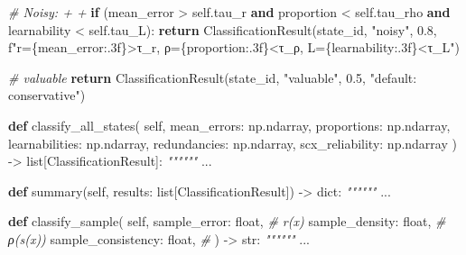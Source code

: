 \documentclass[
  12pt,
]{article}
\newenvironment{Shaded}{}{}
\newcommand{\BuiltInTok}[1]{\textcolor[rgb]{0.00,0.50,0.00}{#1}}
\newcommand{\CommentTok}[1]{\textcolor[rgb]{0.38,0.63,0.69}{\textit{#1}}}
\newcommand{\ControlFlowTok}[1]{\textcolor[rgb]{0.00,0.44,0.13}{\textbf{#1}}}
\newcommand{\FloatTok}[1]{\textcolor[rgb]{0.25,0.63,0.44}{#1}}
\newcommand{\KeywordTok}[1]{\textcolor[rgb]{0.00,0.44,0.13}{\textbf{#1}}}
\newcommand{\NormalTok}[1]{#1}
\newcommand{\OperatorTok}[1]{\textcolor[rgb]{0.40,0.40,0.40}{#1}}
\newcommand{\SpecialCharTok}[1]{\textcolor[rgb]{0.25,0.44,0.63}{#1}}
\newcommand{\SpecialStringTok}[1]{\textcolor[rgb]{0.73,0.40,0.53}{#1}}
\newcommand{\StringTok}[1]{\textcolor[rgb]{0.25,0.44,0.63}{#1}}
\newcommand{\VariableTok}[1]{\textcolor[rgb]{0.10,0.09,0.49}{#1}}
\begin{document}
\begin{Shaded}
\begin{Highlighting}[]
        \CommentTok{\# Noisy:  +  + }
        \ControlFlowTok{if}\NormalTok{ (mean\_error }\OperatorTok{\textgreater{}} \VariableTok{self}\NormalTok{.tau\_r }\KeywordTok{and}\NormalTok{ proportion }\OperatorTok{\textless{}} \VariableTok{self}\NormalTok{.tau\_rho}
                \KeywordTok{and}\NormalTok{ learnability }\OperatorTok{\textless{}} \VariableTok{self}\NormalTok{.tau\_L):}
            \ControlFlowTok{return}\NormalTok{ ClassificationResult(state\_id, }\StringTok{"noisy"}\NormalTok{, }\FloatTok{0.8}\NormalTok{,}
                \SpecialStringTok{f"r=}\SpecialCharTok{\{}\NormalTok{mean\_error}\SpecialCharTok{:.3f\}}\SpecialStringTok{\textgreater{}τ\_r, ρ=}\SpecialCharTok{\{}\NormalTok{proportion}\SpecialCharTok{:.3f\}}\SpecialStringTok{\textless{}τ\_ρ, L=}\SpecialCharTok{\{}\NormalTok{learnability}\SpecialCharTok{:.3f\}}\SpecialStringTok{\textless{}τ\_L"}\NormalTok{)}

        \CommentTok{\#  valuable}
        \ControlFlowTok{return}\NormalTok{ ClassificationResult(state\_id, }\StringTok{"valuable"}\NormalTok{, }\FloatTok{0.5}\NormalTok{, }\StringTok{"default: conservative"}\NormalTok{)}

    \KeywordTok{def}\NormalTok{ classify\_all\_states(}
        \VariableTok{self}\NormalTok{,}
\NormalTok{        mean\_errors: np.ndarray,}
\NormalTok{        proportions: np.ndarray,}
\NormalTok{        learnabilities: np.ndarray,}
\NormalTok{        redundancies: np.ndarray,}
\NormalTok{        scx\_reliability: np.ndarray}
\NormalTok{    ) }\OperatorTok{{-}\textgreater{}} \BuiltInTok{list}\NormalTok{[ClassificationResult]:}
        \CommentTok{""""""}
\NormalTok{        ...}

    \KeywordTok{def}\NormalTok{ summary(}\VariableTok{self}\NormalTok{, results: }\BuiltInTok{list}\NormalTok{[ClassificationResult]) }\OperatorTok{{-}\textgreater{}} \BuiltInTok{dict}\NormalTok{:}
        \CommentTok{""""""}
\NormalTok{        ...}

    \KeywordTok{def}\NormalTok{ classify\_sample(}
        \VariableTok{self}\NormalTok{,}
\NormalTok{        sample\_error: }\BuiltInTok{float}\NormalTok{,          }\CommentTok{\# r(x)}
\NormalTok{        sample\_density: }\BuiltInTok{float}\NormalTok{,        }\CommentTok{\# ρ(s(x))}
\NormalTok{        sample\_consistency: }\BuiltInTok{float}\NormalTok{,    }\CommentTok{\# }
\NormalTok{    ) }\OperatorTok{{-}\textgreater{}} \BuiltInTok{str}\NormalTok{:}
        \CommentTok{""""""}
\NormalTok{        ...}
\end{Highlighting}
\end{Shaded}
\end{document}
